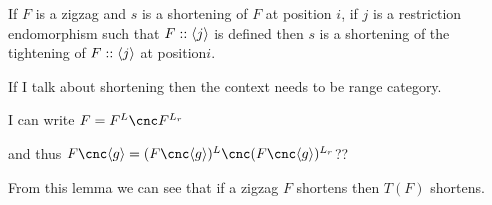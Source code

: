 {\begin{corollary}
If $F$ is a zigzag and $s$ is a shortening of $F$ at position $i$,
if $j$ is a restriction endomorphism 
such that $F :: \langle j\rangle$ is defined then
$s$ is a shortening of 
the tightening of $F :: \langle j\rangle$ at position$i$.
\end{corollary}

\begin{aside}
If I talk about shortening then the context
needs to be  range category.
\end{aside}

\begin{aside}
I can write  $F= F^{L} \cnc F^{L_r}$

and thus $F\cnc\tuple{g} = (F\cnc\tuple{g})^{L} \cnc (F\cnc\tuple{g})^{L_r}$??

\end{aside}

From this lemma we can see that if a zigzag $F$ shortens then $T(F)$ shortens.


}
